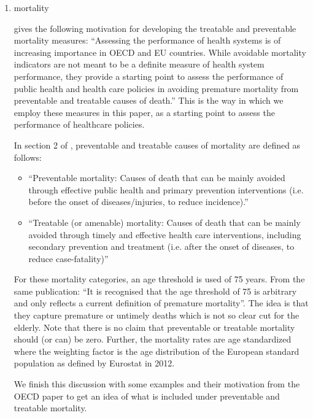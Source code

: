 \documentclass[a4paper,12pt]{article}
\begin{document}
\begin{enumerate}
\item mortality
\label{sec:org87289de}
\label{sec:mortality}

\cite{OECD_avoidable_mortality} gives the following motivation for developing the treatable and preventable mortality measures: ``Assessing the performance of health systems is of increasing importance in OECD and EU countries. While avoidable mortality indicators are not meant to be a definite measure of health system performance, they provide a starting point to assess the performance of public health and health care policies in avoiding premature mortality from preventable and treatable causes of death.'' This is the way in which we employ these measures in this paper, as a starting point to assess the performance of healthcare policies. 

In section 2 of \cite{OECD_avoidable_mortality}, preventable and treatable causes of mortality are defined as follows:
\begin{itemize}
\item ``Preventable mortality: Causes of death that can be mainly avoided through effective public health and primary prevention interventions (i.e. before the onset of diseases/injuries, to reduce incidence).''
\item ``Treatable (or amenable) mortality: Causes of death that can be mainly avoided through timely and effective health care interventions, including secondary prevention and treatment (i.e. after the onset of diseases, to reduce case-fatality)''
\end{itemize}

For these mortality categories, an age threshold is used of 75 years. From the same publication: ``It is recognised that the age threshold of 75 is arbitrary and only reflects a current definition of premature mortality''. The idea is that they capture premature or untimely deaths which is not so clear cut for the elderly. Note that there is no claim that preventable or treatable mortality should (or can) be zero. Further, the mortality rates are age standardized where the weighting factor is the age distribution of the European standard population as defined by Eurostat in 2012.

We finish this discussion with some examples and their motivation from the OECD paper to get an idea of what is included under preventable and treatable mortality.


\end{enumerate}
\end{document}
